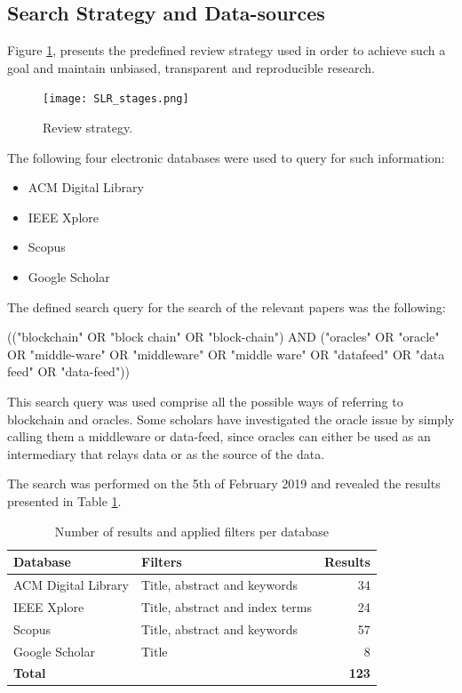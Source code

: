 \subsection{Search Strategy and Data-sources}
Figure \ref{fig:/figures/SLR_stages}, presents the predefined review strategy used in order to achieve such a goal and maintain unbiased, transparent and reproducible research.

\begin{figure}[t]
  \begin{center}
    \leavevmode
    \texttt{[image: SLR\_stages.png]}
    \caption{Review strategy.}
    \label{fig:/figures/SLR_stages}
  \end{center}
\end{figure}

The following four electronic databases were used to query for such information:

\begin{itemize}
\item ACM Digital Library
\item IEEE Xplore
\item Scopus
\item Google Scholar
\end{itemize}


The defined search query for the search of the relevant papers was the following:

(("blockchain" OR "block chain" OR "block-chain") 
AND 
("oracles" OR "oracle" OR "middle-ware" OR "middleware" OR "middle ware" OR "datafeed" OR "data feed" OR "data-feed"))

This search query was used comprise all the possible ways of referring to blockchain and oracles. Some scholars have investigated the oracle issue by simply calling them a middleware or data-feed, since oracles can either be used as an intermediary that relays data or as the source of the data.

The search was performed on the 5th of February 2019 and revealed the results presented in Table \ref{search-results-table}.

\begin{table}[H]
\centering
\begin{tabular}{llr}
\hline
\textbf{Database} & \textbf{Filters} & \textbf{Results} \\ \hline
ACM Digital Library & Title, abstract and keywords & 34 \\
IEEE Xplore & Title, abstract and index terms & 24 \\
Scopus & Title, abstract and keywords & 57 \\
Google Scholar & Title & 8 \\ \hline
\textbf{Total} & \textbf{} & \textbf{123} \\ \hline
\end{tabular}
\caption{Number of results and applied filters per database}
\label{search-results-table}
\end{table}


